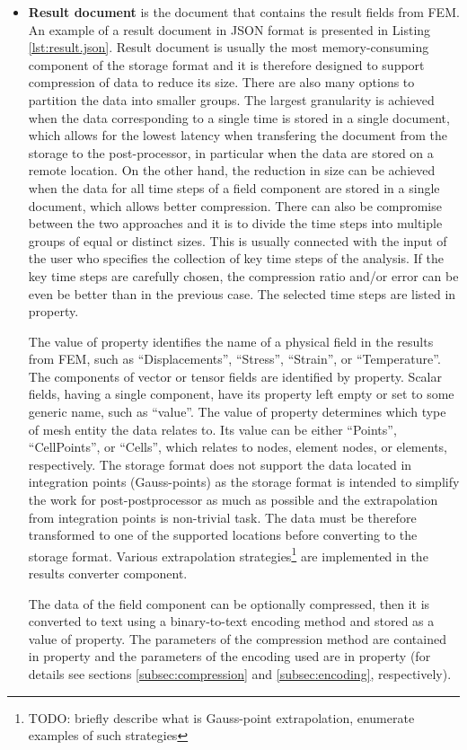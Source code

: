\begin{itemize}
    \item \textbf{Result document} is the document that contains the result fields from FEM. An example of a result document in JSON format is presented in Listing \ref{lst:result.json}. Result document is usually the most memory-consuming component of the storage format and it is therefore designed to support compression of data to reduce its size. There are also many options to partition the data into smaller groups. The largest granularity is achieved when the data corresponding to a single time is stored in a single document, which allows for the lowest latency when transfering the document from the storage to the post-processor, in particular when the data are stored on a remote location. On the other hand, the reduction in size can be achieved when the data for all time steps of a field component are stored in a single document, which allows better compression. There can also be compromise between the two approaches and it is to divide the time steps into multiple groups of equal or distinct sizes. This is usually connected with the input of the user who specifies the collection of key time steps of the analysis. If the key time steps are carefully chosen, the compression ratio and/or error can be even be better than in the previous case. The selected time steps are listed in  property.

    The value of  property identifies the name of a physical field in the results from FEM, such as ``Displacements'', ``Stress'', ``Strain'', or ``Temperature''. The components of vector or tensor fields are identified by  property. Scalar fields, having a single component, have its  property left empty or set to some generic name, such as ``value''. The value of  property determines which type of mesh entity the data relates to. Its value can be either ``Points'', ``CellPoints'', or ``Cells'', which relates to nodes, element nodes, or elements, respectively. The storage format does not support the data located in integration points (Gauss-points) as the storage format is intended to simplify the work for post-postprocessor as much as possible and the extrapolation from integration points is non-trivial task. The data must be therefore transformed to one of the supported locations before converting to the storage format. Various extrapolation strategies\footnote{TODO: briefly describe what is Gauss-point extrapolation, enumerate examples of such strategies} are implemented in the results converter component.

    The data of the field component can be optionally compressed, then it is converted to text using a binary-to-text encoding method and stored as a value of  property. The parameters of the compression method are contained in  property and the parameters of the encoding used are in  property (for details see sections \ref{subsec:compression} and \ref{subsec:encoding}, respectively).

\end{itemize}

